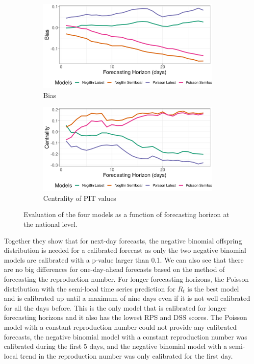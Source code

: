 \documentclass[12pt]{article}
\begin{document}
\begin{figure}[h!]
\begin{subfigure}{0.5\textwidth}
  \centering
  \includegraphics[width=\linewidth]{../output/national_bias.png}  
  \caption{Bias}
  \label{fig:sub-third}
\end{subfigure}
\begin{subfigure}{0.5\textwidth}
  \centering
  \includegraphics[width=\linewidth]{../output/national_centrality.png}  
  \caption{Centrality of PIT values}
  \label{fig:nat_scores_4}
\end{subfigure}
  \caption{Evaluation of the four models as a function of forecasting horizon at the national level.}

  \label{fig:national_scores}
\end{figure}

Together they show that for next-day forecasts, the negative binomial offspring distribution is needed for a calibrated forecast as only the two negative binomial models are calibrated with a p-value larger than 0.1. We can also see that there are no big differences for one-day-ahead forecasts based on the method of forecasting the reproduction number. For longer forecasting horizons, the Poisson distribution with the semi-local time series prediction for $R_t$ is the best model and is calibrated up until a maximum of nine days even if it is not well calibrated for all the days before. This is the only model that is calibrated for longer forecasting horizons and it also has the lowest RPS and DSS scores. The Poisson model with a constant reproduction number could not provide any calibrated forecasts, the negative binomial model with a constant reproduction number was calibrated during the first 5 days, and the negative binomial model with a semi-local trend in the reproduction number was only calibrated for the first day.
\end{document}
